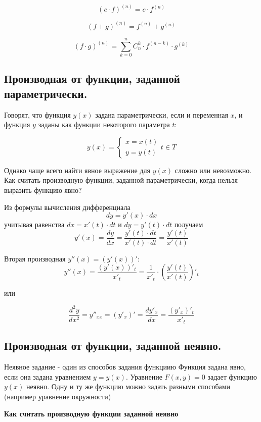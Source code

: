 \documentclass[a4paper,12pt]{article}
\theoremstyle{plain} %
\theoremstyle{definition} %
\theoremstyle{remark} %
\begin{document}
\[
	(c \cdot f)^{(n)} = c \cdot f^{(n)}
\]

\[
	(f + g)^{(n)} = f^{(n)} + g^{(n)}
\]

\[
	(f \cdot g)^{(n)} = \sum_{k = 0}^{n} C_n^k \cdot f^{(n-k)} \cdot g^{(k)}
\]


\newpage
\subsection*{Производная от функции, заданной параметрически.}

Говорят, что функция $y(x)$ задана параметрически, если и переменная $x$, и функция $y$ заданы как функции некоторого параметра $t$:

\[
	y(x) =
	\begin{cases}
		x = x(t) \\
		y = y(t)
	\end{cases} t\in T
\]

Однако чаще всего найти явное выражение для $y(x)$ сложно или невозможно. Как считать производную функции, заданной параметрически, когда нельзя выразить функцию явно?

Из формулы вычисления дифференциала \[ dy = y'(x) \cdot dx \] учитывая равенства $ dx = x'(t) \cdot dt $ и $ dy = y'(t) \cdot dt $ получаем \[ y'(x) = \frac{dy}{dx} = \frac{y'(t) \cdot dt}{x'(t) \cdot dt} = \frac{y'(t)}{x'(t)} \]

Вторая производная $y''(x) = (y'(x))'$:
\[
	y''(x) = \frac{(y'(x))'_t}{x'_t} = \frac{1}{x'_t} \cdot \left( \frac{y'(t)}{x'(t)} \right)'_t
\]

или

\[
	\frac{d^2y}{dx^2} = y''_{xx} = (y'_x)' = \frac{dy'_x}{dx} = \frac{(y'_x)'_t}{x'_t}
\]

\newpage
\subsection*{Производная от функции, заданной неявно.                                                   }

Неявное задание - один из способов задания функциию Функция задана явно, если она задана уравнением $y = y(x)$. Уравнение $F(x, y) = 0$ задает функцию $y(x)$ неявно. Одну и ту же функцию можно задать разными способами (например уравнение окружности)

\textbf{Как считать производную функции заданной неявно}
\end{document}
